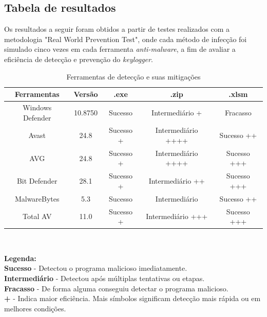 \documentclass[12pt]{article}
\begin{document}
\subsection{Tabela de resultados}
Os resultados a seguir foram obtidos a partir de testes realizados com a metodologia "Real World Prevention Test", onde cada método de infecção foi simulado cinco vezes em cada ferramenta \textit{anti-malware}, a fim de avaliar a eficiência de detecção e prevenção do \textit{keylogger}.
\begin{table}[h!]
    \centering
    \begin{tabular}{|c|c|c|c|c|}
        \hline
        \textbf{Ferramentas} & \textbf{Versão} & \textbf{.exe} & \textbf{.zip}      & \textbf{.xlsm} \\
        \hline
        Windows Defender     & 10.8750    & Sucesso       & Intermediário +    & Fracasso       \\
        \hline
        Avast                & 24.8      & Sucesso +     & Intermediário ++++ & Sucesso ++     \\
        \hline
        AVG                  & 24.8      & Sucesso +     & Intermediário ++++ & Sucesso +++    \\
        \hline
        Bit Defender         & 28.1      & Sucesso +     & Intermediário ++   & Sucesso +++    \\
        \hline
        MalwareBytes         & 5.3       & Sucesso       & Intermediário      & Sucesso ++     \\
        \hline
        Total AV             & 11.0         & Sucesso +     & Intermediário +++  & Sucesso +++    \\
        \hline
    \end{tabular}\\

    \caption{Ferramentas de detecção e suas mitigações}

    \label{tab:ferramentas}
\end{table}
\begin{flushleft}
    \textbf{Legenda:} \\
    \textbf{Sucesso} - Detectou o programa malicioso imediatamente.\\
    \textbf{Intermediário} - Detectou após múltiplas tentativas ou etapas.\\
    \textbf{Fracasso} - De forma alguma conseguiu detectar o programa malicioso.\\
    \textbf{+} - Indica maior eficiência. Mais símbolos significam detecção mais rápida ou em melhores condições.
\end{flushleft}
\end{document}
